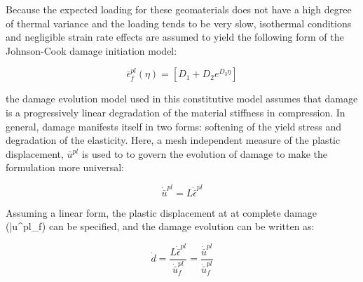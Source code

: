 Because the expected loading for these geomaterials does not have a high degree of thermal variance and the loading tends to be very slow, isothermal conditions and negligible strain rate effects are assumed to yield the following form of the Johnson-Cook damage initiation model:

\begin{equation}
\bar{\epsilon}_{f}^{pl}\left(\eta\right)=\left[D_{1}+D_{2}e^{D_{3}\eta}\right]\label{eqn:druc8}
\end{equation}

the damage evolution model used in this constitutive model assumes that damage is a progressively linear degradation of the material stiffness in compression.  In general, damage manifests itself in two forms: softening of the yield stress and degradation of the elasticity. Here, a mesh independent measure of the plastic displacement, $\bar{u}^{pl}$ is used to to govern the evolution of damage to make the formulation more universal:

\begin{equation}
\dot{\bar{u}}^{pl}=L\dot{\bar{\epsilon}}^{pl}\label{eqn:druc9}
\end{equation}


Assuming a linear form, the plastic displacement at at complete damage
(\bar{u}^{pl}_f) can be specified, and the damage evolution can be written as:

\begin{equation}
\dot{d}=\frac{L\dot{\bar{\epsilon}}^{pl}}{\dot{\bar{u}}_{f}^{pl}}=\frac{\dot{\bar{u}}^{pl}}{\dot{\bar{u}}_{f}^{pl}}\label{eqn:druc9-1}
\end{equation}
